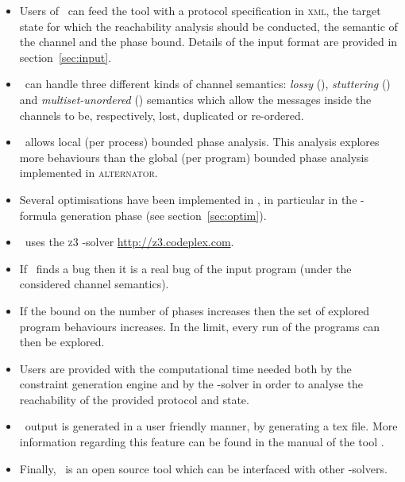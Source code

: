 \begin{itemize}
\item Users of \MPass\ can feed the tool with a protocol specification in \textsc{xml}, the target state for which the reachability analysis should be conducted, the semantic of the channel and the phase bound. Details of the input format are provided in section~\ref{sec:input}.
%
\item \MPass\ can handle three different kinds of channel semantics: {\it lossy} (\LCS), {\it stuttering} (\SLCS) and {\it multiset-unordered} (\UCS) semantics which allow the messages inside the channels to be, respectively, lost, duplicated or re-ordered.
\item \MPass\ allows local (per process) bounded phase analysis.
This analysis explores more behaviours than the global (per program) bounded phase analysis implemented in \textsc{alternator}.
%
\item Several optimisations have been implemented in \MPass, in particular in the \Smt-formula generation phase (see section~\ref{sec:optim}).
%
\item \MPass\ uses the \textsc{z3} \Smt-solver \url{http://z3.codeplex.com}.
\item If \MPass\ finds a bug then it is a real bug of the input program (under the considered channel semantics).
%
\item If the bound on the number of phases increases then the set of explored program behaviours increases.
In the limit, every run of the programs can then be explored.
\item Users are provided with the computational time needed both by the constraint generation engine and by
  the \Smt-solver in order to analyse the reachability of the provided protocol and state.
%
\item \MPass\ output is generated in a user friendly manner, by generating a tex file.
More information regarding this feature can be found in the manual of the tool \cite{github.MPass}.
%
\item Finally, \MPass\ is an open source tool which can be interfaced with other \Smt-solvers.
\end{itemize}


